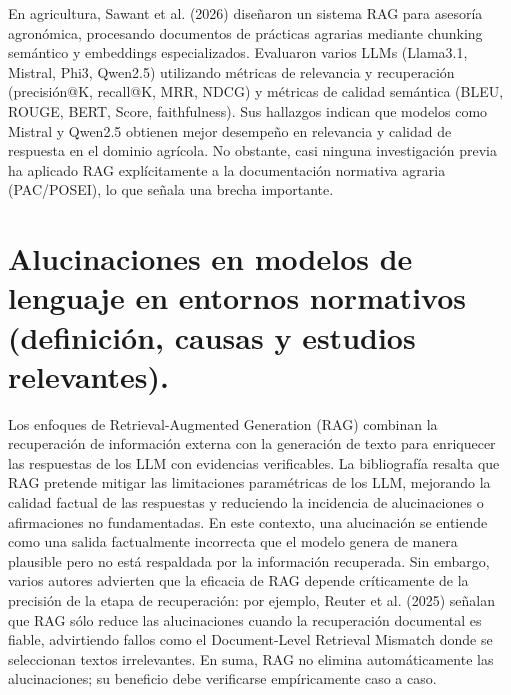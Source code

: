 En agricultura, Sawant et al. (2026) diseñaron un sistema RAG para asesoría agronómica, procesando documentos de prácticas agrarias mediante chunking semántico y embeddings especializados. Evaluaron varios LLMs (Llama3.1, Mistral, Phi3, Qwen2.5) utilizando métricas de relevancia y recuperación (precisión@K, recall@K, MRR, NDCG) y métricas de calidad semántica (BLEU, ROUGE, BERT, Score, faithfulness). Sus hallazgos indican que modelos como Mistral y Qwen2.5 obtienen mejor desempeño en relevancia y calidad de respuesta en el dominio agrícola. No obstante, casi ninguna investigación previa ha aplicado RAG explícitamente a la documentación normativa agraria (PAC/POSEI), lo que señala una brecha importante.

\section{Alucinaciones en modelos de lenguaje en entornos normativos (definición, causas y estudios relevantes).}
Los enfoques de Retrieval-Augmented Generation (RAG) combinan la recuperación de información externa con la generación de texto para enriquecer las respuestas de los LLM con evidencias verificables. La bibliografía resalta que RAG pretende mitigar las limitaciones paramétricas de los LLM, mejorando la calidad factual de las respuestas y reduciendo la incidencia de alucinaciones o afirmaciones no fundamentadas. En este contexto, una alucinación se entiende como una salida factualmente incorrecta que el modelo genera de manera plausible pero no está respaldada por la información recuperada. Sin embargo, varios autores advierten que la eficacia de RAG depende críticamente de la precisión de la etapa de recuperación: por ejemplo, Reuter et al. (2025) señalan que RAG sólo reduce las alucinaciones cuando la recuperación documental es fiable, advirtiendo fallos como el Document-Level Retrieval Mismatch donde se seleccionan textos irrelevantes. En suma, RAG no elimina automáticamente las alucinaciones; su beneficio debe verificarse empíricamente caso a caso.

